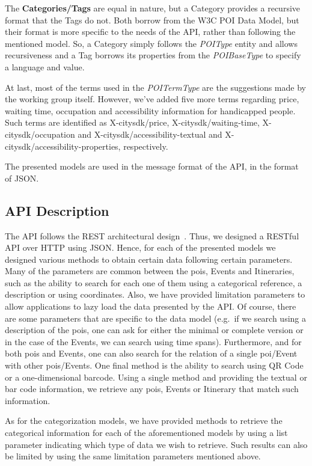 \documentclass[times,doublespace]{ettauth}%
\begin{document}
The \textbf{Categories/Tags} are equal in nature, but a Category provides a recursive format that the Tags do not. Both borrow from the W3C POI Data Model, but their format is more specific to the needs of the API, rather than following the mentioned model. So, a Category simply follows the \textit{POIType} entity and allows recursiveness and a Tag borrows its properties from the \textit{POIBaseType} to specify a language and value.

At last, most of the terms used in the \textit{POITermType} are the suggestions made by the working group itself. However, we've added five more terms regarding price, waiting time, occupation and accessibility information for handicapped people. Such terms are identified as X-citysdk/price, X-citysdk/waiting-time, X-citysdk/occupation and X-citysdk/accessibility-textual and X-citysdk/accessibility-properties, respectively.

The presented models are used in the message format of the API, in the format of \ac{JSON}.

\subsection{API Description}
\label{s:api-description}
The API follows the \ac{REST} architectural design~\cite{Fielding:2002:PDM:514183.514185}. Thus, we designed a RESTful API over HTTP using \ac{JSON}. Hence, for each of the presented models we designed various methods to obtain certain data following certain parameters. Many of the parameters are common between the \acp{poi}, Events and Itineraries, such as the ability to search for each one of them using a categorical reference, a description or using coordinates. Also, we have provided limitation parameters to allow applications to lazy load the data presented by the API\@. Of course, there are some parameters that are specific to the data model (e.g.\ if we search using a description of the \acp{poi}, one can ask for either the minimal or complete version or in the case of the Events, we can search using time spans). Furthermore, and for both \acp{poi} and Events, one can also search for the relation of a single \ac{poi}/Event with other \acp{poi}/Events. One final method is the ability to search using QR Code or a one-dimensional barcode. Using a single method and providing the textual or bar code information, we retrieve any \acp{poi}, Events or Itinerary that match such information. %

As for the categorization models, we have provided methods to retrieve the categorical information for each of the aforementioned models by using a list parameter indicating which type of data we wish to retrieve. Such results can also be limited by using the same limitation parameters mentioned above.
\end{document}
